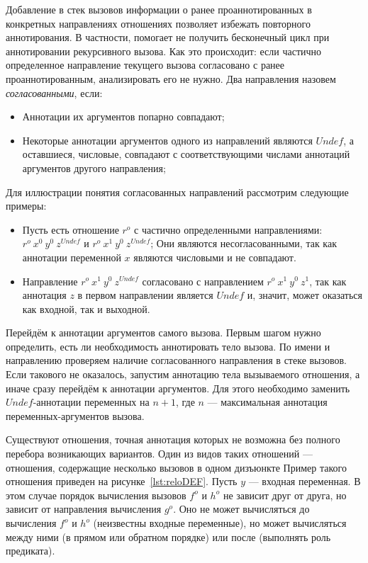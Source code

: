 Добавление в стек вызовов информации о ранее проаннотированных в конкретных направлениях отношениях позволяет избежать повторного аннотирования.
В частности, помогает не получить бесконечный цикл при аннотировании рекурсивного вызова.
Как это происходит: если частично определенное направление текущего вызова согласовано с ранее проаннотированным, анализировать его не нужно.
Два направления назовем \emph{согласованными}, если:
\begin{itemize}
    \item Аннотации их аргументов попарно совпадают;
    \item Некоторые аннотации аргументов одного из направлений являются $Undef$, а оставшиеся, числовые, совпадают с соответствующими числами аннотаций аргументов другого направления;
\end{itemize}

Для иллюстрации понятия согласованных направлений рассмотрим следующие примеры:
\begin{itemize}
    \item Пусть есть отношение $r^o$ с частично определенными направлениями: $r^o \ x^0 \ y^0 \ z^{Undef}$ и $r^o \ x^1 \ y^0 \ z^{Undef}$;
        Они являются несогласованными, так как аннотации переменной $x$ являются числовыми и не совпадают.
    \item Направление $r^o \ x^1 \ y^0 \ z^{Undef}$ согласовано с направлением $r^o \ x^1 \ y^0 \ z^1$, так как аннотация $z$ в первом направлении является $Undef$ и, значит, может оказаться как входной, так и выходной.
\end{itemize}

Перейдём к аннотации аргументов самого вызова.
Первым шагом нужно определить, есть ли необходимость аннотировать тело вызова.
По имени и направлению проверяем наличие согласованного направления в стеке вызовов.
Если такового не оказалось, запустим аннотацию тела вызываемого отношения, а иначе сразу перейдём к аннотации аргументов.
Для этого необходимо заменить $Undef$-аннотации переменных на $n+1$, где $n$ --- максимальная аннотация переменных-аргументов вызова.


Существуют отношения, точная аннотация которых не возможна без полного перебора возникающих вариантов. 
Один из видов таких отношений --- отношения, содержащие несколько вызовов в одном дизъюнкте
Пример такого отношения приведен на рисунке~\ref{lst:reloDEF}.
Пусть $y$ --- входная переменная.
В этом случае порядок вычисления вызовов $f^o$ и $h^o$ не зависит друг от друга, но зависит от направления вычисления $g^o$.
Оно не может вычисляться до вычисления $f^o$ и $h^o$ (неизвестны входные переменные), но может вычисляться между ними (в прямом или обратном порядке) или после (выполнять роль предиката).

